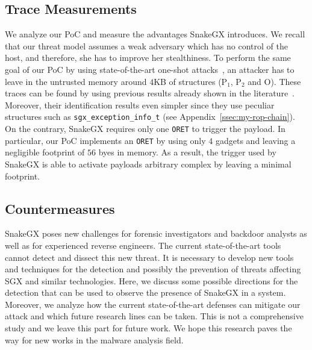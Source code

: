 \subsection{Trace Measurements}
\label{ssec:comparison}
We analyze our PoC and measure the advantages SnakeGX introduces.
We recall that our threat model assumes a weak adversary which has no control 
of the host, and therefore, she has to improve her stealthiness.
To perform the same goal of our PoC by using state-of-the-art one-shot 
attacks~\citep{biondo2018guard}, an attacker has to leave in the untrusted 
memory around $4$KB of structures (\ie P$_1$, P$_2$ and O).
These traces can be found by using previous results already shown in the 
literature~\citep{stancill2013check,polychronakis2011rop,kittel2015counteracting,Graziano:2016:RFA:2897845.2897894}.
Moreover, their identification results even simpler since
they use peculiar structures such as 
\texttt{sgx\_exception\_info\_t} (see Appendix~\ref{ssec:my-rop-chain}).
On the contrary, SnakeGX requires only one \texttt{ORET} to trigger the
payload.
In particular, our PoC implements an \texttt{ORET} by using only $4$ gadgets 
and leaving a negligible footprint of $56$ byes in memory. 
As a result, the trigger used by SnakeGX is able to activate payloads 
arbitrary complex by leaving a minimal footprint.

\subsection{Countermeasures}
\label{ssec:detection}

SnakeGX poses new challenges for forensic investigators and backdoor analysts 
as well as for experienced reverse engineers.
The current state-of-the-art tools cannot detect and dissect this new threat. 
It is necessary to develop 
new tools and techniques for the detection and possibly the prevention of 
threats affecting SGX and similar technologies.
Here, we discuss some possible directions for the detection that can be used to 
observe the presence of SnakeGX in a system.
Moreover, we analyze how the current state-of-the-art defenses
can mitigate our attack and which future research lines can be taken.
This is not a comprehensive study and we leave this part for future work.
We hope this research paves the way for new works in the malware analysis field.

